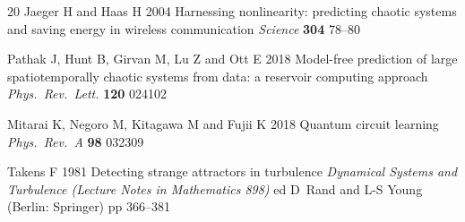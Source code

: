 \documentclass[a4paper,12pt]{iopart}
\begin{document}
\begin{thebibliography}{20}
 Jaeger H and Haas H 2004 Harnessing
nonlinearity: predicting chaotic systems and saving energy in wireless
communication \textit{Science} \textbf{304} 78--80

 Pathak J, Hunt B, Girvan M, Lu Z and Ott E
2018 Model-free prediction of large spatiotemporally chaotic systems
from data: a reservoir computing approach \textit{Phys.\ Rev.\ Lett.}
\textbf{120} 024102

 Mitarai K, Negoro M, Kitagawa M and Fujii
K 2018 Quantum circuit learning \textit{Phys.\ Rev.\ A} \textbf{98}
032309

 Takens F 1981 Detecting strange attractors in
turbulence \textit{Dynamical Systems and Turbulence (Lecture Notes in
Mathematics 898)} ed D~Rand and L-S Young (Berlin: Springer)
pp 366--381

\end{thebibliography}
\end{document}
